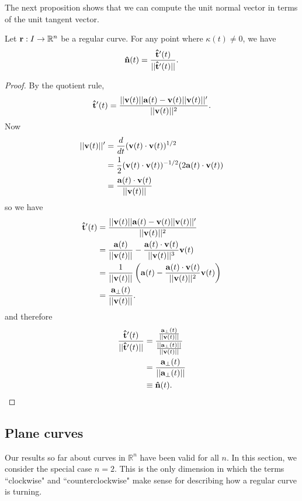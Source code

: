 \documentclass[12pt,letterpaper,reqno]{article}
\numberwithin{equation}{section}
\newcommand{\R}{\ensuremath{\mathbb R}}
\newcommand{\bv}{{\bf v}}
\newcommand{\ba}{{\bf a}}
\newcommand{\bbr}{{\bf r}}
\newcommand{\ut}{{\bf {\hat{t}}}}
\newcommand{\un}{{\bf {\hat{n}}}}
\begin{document}
{The next proposition shows that we can compute the unit normal vector in terms of the unit tangent vector.

\begin{prop}
Let $\bbr:I \to \R^n$ be a regular curve. For any point where $\kappa(t) \neq 0$, we have
\begin{align*}
	\un(t)=\frac{\ut'(t)}{||\ut'(t)||}.
\end{align*}
\end{prop}

\begin{proof}
	By the quotient rule,
	\begin{align*}
		\ut'(t)=\frac{||\bv(t)||\ba(t)-\bv(t)||\bv(t)||'}{||\bv(t)||^2}.
	\end{align*}
	Now
	\begin{align*}
		||\bv(t)||'&=\frac{d}{dt}(\bv(t) \cdot \bv(t))^{1/2} \\
		&=\frac{1}{2}(\bv(t) \cdot \bv(t))^{-1/2}(2\ba(t) \cdot \bv(t)) \\
		&=\frac{\ba(t) \cdot \bv(t)}{||\bv(t)||} \\
	\end{align*}
	so we have
	\begin{align*}
		\ut'(t)&=\frac{||\bv(t)||\ba(t)-\bv(t)||\bv(t)||'}{||\bv(t)||^2} \\
		&=\frac{\ba(t)}{||\bv(t)||}-\frac{\ba(t) \cdot \bv(t)}{||\bv(t)||^3}\bv(t) \\
		&=\frac{1}{||\bv(t)||}\left(\ba(t)-\frac{\ba(t) \cdot \bv(t)}{||\bv(t)||^2}\bv(t)\right) \\
		&=\frac{\ba_\perp(t)}{||\bv(t)||}.
	\end{align*}
	and therefore
	\begin{align*}
		\frac{\ut'(t)}{||\ut'(t)||}&=\frac{\frac{\ba_\perp(t)}{||\bv(t)||}}{\frac{||\ba_\perp(t)||}{||\bv(t)||}} \\
		&=\frac{\ba_\perp(t)}{||\ba_\perp(t)||} \\
		&\equiv \un(t).
	\end{align*}
\end{proof}

\subsection{Plane curves}
Our results so far about curves in $\R^n$ have been valid for all $n$. In this section, we consider the special case $n=2$. This is the only dimension in which the terms ``clockwise" and ``counterclockwise" make sense for describing how a regular curve is turning.

}
\end{document}
